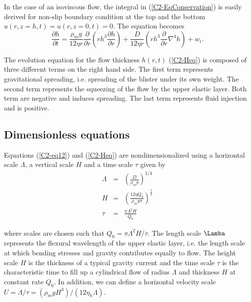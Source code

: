 In   the   case    of   an   isoviscous   flow,    the   integral   in
(\ref{C2-EqConservation})  is  easily  derived for  non-slip  boundary
condition  at the  top and  the bottom  $u(r,z=h,t)=u(r,z=0,t)=0$. The
equation becomes
\begin{equation}
  \frac{\partial h}{\partial t} =\frac{\rho_mg}{12 \eta r}
  \frac{\partial}{\partial r}  \left( rh^3  \frac{\partial h}{\partial
      r}\right)+\frac{D}{12\eta r} \left( rh^3 \frac{\partial}{\partial r}\nabla^4h\right)+
  w_i .\label{C2-Heq}
\end{equation}

The evolution equation for  the flow thickness $h(r,t)$ (\ref{C2-Heq})
is composed of three different terms on the right hand side. The first
term  represents  gravitational  spreading,  i.e.   spreading  of  the
blister under its own weight. The second term represents the squeezing
of the  flow by the upper  elastic layer.  Both term  are negative and
induces spreading.   The last term  represents fluid injection  and is
positive.

\subsection{Dimensionless equations}
\label{sec:dimens-equat-1}

Equations  (\ref{C2-eq12}) and  (\ref{C2-Heq}) are  nondimensionalized
using a  horizontal scale $\Lambda$, a  vertical scale $H$ and  a time
scale $\tau$ given by
\begin{eqnarray}
  \Lambda &=& \left(\frac{D}{\rho_m g}\right)^{1/4}\label{L1}\\
  H&=&\left       (\frac{12\eta      Q_{0}}{\rho_{m}g       \pi}\right      )
       ^{\frac{1}{4}} \label{H1}\\
  \tau&=&\frac{\pi \Lambda^{2} H}{Q_{0}}\label{T1}
\end{eqnarray}

where scales  are chosen  such that $Q_0  = \pi\Lambda^2  H/\tau$. The
length scale $\Lamba$ represents the  flexural wavelength of the upper
elastic layer,  i.e. the  length scale at  which bending  stresses and
gravity  contributes equally  to flow.   The height  scale $H$  is the
thickness of  a typical gravity current  and the time scale  $\tau$ is
the  characteristic time  to  fill  up a  cylindrical  flow of  radius
$\Lambda$ and thickness  $H$ at constant rate $Q_0$.   In addition, we
can       define        a       horizontal        velocity       scale
$U=\Lambda/\tau=\left(\rho_m           g           H^3\right)/\left(12
  \eta_h\Lambda\right)$.

